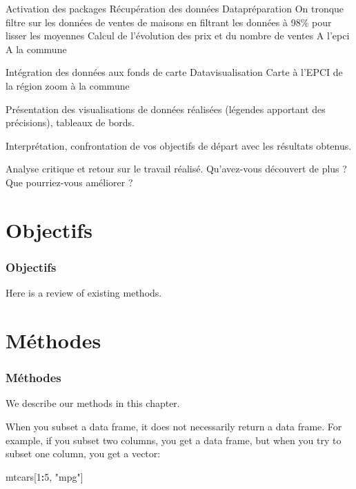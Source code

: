 \documentclass[
  french,
]{article}
\newenvironment{Shaded}{\begin{snugshade}}{\end{snugshade}}
\newcommand{\DecValTok}[1]{\textcolor[rgb]{0.00,0.00,0.81}{#1}}
\newcommand{\NormalTok}[1]{#1}
\newcommand{\OperatorTok}[1]{\textcolor[rgb]{0.81,0.36,0.00}{\textbf{#1}}}
\newcommand{\StringTok}[1]{\textcolor[rgb]{0.31,0.60,0.02}{#1}}
\begin{document}
Activation des packages
Récupération des données
Datapréparation
On tronque filtre sur les données de ventes de maisons en filtrant les données à 98\% pour lisser les moyennes
Calcul de l'évolution des prix et du nombre de ventes
A l'epci
A la commune

Intégration des données aux fonds de carte
Datavisualisation
Carte à l'EPCI de la région
zoom à la commune

Présentation des visualisations de données réalisées (légendes apportant des précisions), tableaux de bords.

Interprétation, confrontation de vos objectifs de départ avec les résultats obtenus.

Analyse critique et retour sur le travail réalisé. Qu'avez-vous découvert de plus ? Que pourriez-vous améliorer ?

\newpage

\hypertarget{part-objectifs}{%
\part{Objectifs}\label{part-objectifs}}

\hypertarget{objectifs}{%
\section{Objectifs}\label{objectifs}}

Here is a review of existing methods.

\hypertarget{part-muxe9thodes}{%
\part{Méthodes}\label{part-muxe9thodes}}

\hypertarget{muxe9thodes}{%
\section{Méthodes}\label{muxe9thodes}}

We describe our methods in this chapter.

When you subset a data frame, it does not necessarily return
a data frame. For example, if you subset two columns, you get
a data frame, but when you try to subset one column, you get
a vector:

\begin{Shaded}
\begin{Highlighting}[]
\NormalTok{mtcars[}\DecValTok{1}\OperatorTok{:}\DecValTok{5}\NormalTok{, }\StringTok{"mpg"}\NormalTok{]}
\end{Highlighting}
\end{Shaded}
\end{document}
